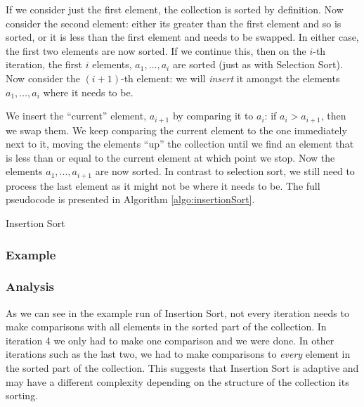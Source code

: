 If we consider just the first element, the collection is sorted by
definition.  Now consider the second element: either its greater than
the first element and so is sorted, or it is less than the first element
and needs to be swapped.  In either case, the first two elements are now
sorted.  If we continue this, then on the $i$-th iteration, the first
$i$ elements, $a_1, \ldots, a_i$ are sorted (just as with Selection Sort).
Now consider the $(i+1)$-th element: we will \emph{insert} it amongst
the elements $a_1, \ldots, a_i$ where it needs to be.

We insert the ``current'' element, $a_{i+1}$ by comparing it to $a_i$: 
if $a_i > a_{i+1}$, then we swap them.  We keep comparing the current
element to the one immediately next to it, moving the elements ``up'' the
collection until we find an element that is less than or equal to the
current element at which point we stop.  Now the elements $a_1, \ldots, a_{i+1}$
are now sorted.  In contrast to selection sort, we still need to process
the last element as it might not be where it needs to be.  The
full pseudocode is presented in Algorithm \ref{algo:insertionSort}.

\begin{algorithm}[H]
\caption{Insertion Sort}
\label{algo:insertionSort}
\end{algorithm}

\subsubsection{Example}



\subsubsection{Analysis}

As we can see in the example run of Insertion Sort, not every iteration needs
to make comparisons with all elements in the sorted part of the collection.
In iteration 4 we only had to make one comparison and we were done.  In other
iterations such as the last two, we had to make comparisons to \emph{every}
element in the sorted part of the collection.  This suggests that Insertion
Sort is adaptive and may have a different complexity depending on the structure
of the collection its sorting.  


